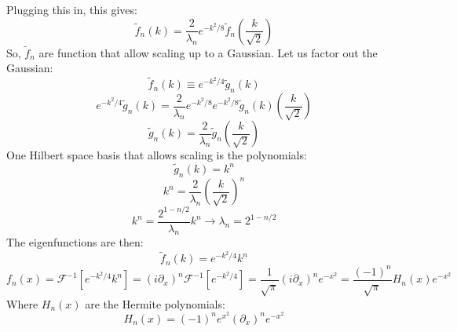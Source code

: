 \documentclass{article}
\begin{document}
Plugging this in, this gives:
\begin{equation}
    \tilde{f}_n(k) = \frac{2}{\lambda_n}e^{-k^2/8}\tilde{f}_n\left(\frac{k}{\sqrt{2}}\right)
\end{equation}
So, $\tilde{f}_n$ are function that allow scaling up to a Gaussian. Let us factor out the Gaussian:
\begin{equation}
    \tilde{f}_n(k) \equiv e^{-k^2/4}\tilde{g}_n(k)
\end{equation}
\begin{equation}
    e^{-k^2/4}\tilde{g}_n(k) = \frac{2}{\lambda_n}e^{-k^2/8}e^{-k^2/8}\tilde{g}_n(k)\left(\frac{k}{\sqrt{2}}\right)
\end{equation}
\begin{equation}
    \tilde{g}_n(k) = \frac{2}{\lambda_n}\tilde{g}_n\left(\frac{k}{\sqrt{2}}\right)
\end{equation}
One Hilbert space basis that allows scaling is the polynomials:
\begin{equation}
    \tilde{g}_n(k) = k^n
\end{equation}
\begin{equation}
    k^n = \frac{2}{\lambda_n}\left(\frac{k}{\sqrt{2}}\right)^n
\end{equation}
\begin{equation}
    k^n = \frac{2^{1 - n/2}}{\lambda_n}k^n \rightarrow \lambda_n = 2^{1 - n/2}
\end{equation}
The eigenfunctions are then:
\begin{equation}
    \tilde{f}_n(k) = e^{-k^2/4}k^n
\end{equation}
\begin{equation}
    f_n(x) = \mathcal{F}^{-1}\left[e^{-k^2/4}k^n\right] =
    \left(i\partial_x\right)^n\mathcal{F}^{-1}\left[e^{-k^2/4}\right] =
    \frac{1}{\sqrt{\pi}}\left(i\partial_x\right)^n e^{-x^2} =
    \frac{(-1)^n }{\sqrt{\pi}}H_n(x) e^{-x^2}
\end{equation}
Where $H_n(x)$ are the Hermite polynomials:
\begin{equation}
    H_n(x) = (-1)^n e^{x^2} (\partial_x)^n e^{-x^2}
\end{equation}
\end{document}
